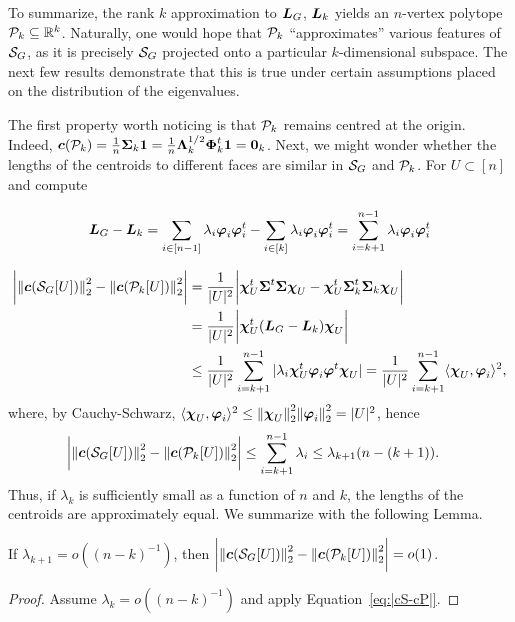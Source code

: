 To  summarize, the rank $k$ approximation to $\L_G$, $\L_k$  yields an  $n$-vertex polytope  $\P_k\subset\R^k$. Naturally, one would hope that $\P_k$    ``approximates'' various features of $\splx_G$, as it is precisely $\splx_G$ projected  onto a particular $k$-dimensional subspace. The next few results  demonstrate that this is true under certain  assumptions placed on the distribution of the eigenvalues. 
 
 The first property worth noticing is that $\P_k$ remains  centred at the  origin. Indeed,  $\cent(\P_k) = \frac{1}{n}\Sv_k\one = \frac{1}{n}\Eval_k^{1/2}\Eig_k^\tp\one=\zero_k$.  Next, we might wonder  whether the lengths of the  centroids to different faces  are similar in $\splx_G$ and $\P_k$. For  $U\subset [n]$ and compute 
 
 \begin{align*}
 \L_G-\L_k = \sum_{i\in[n-1]}\lambda_i\vp_i\vp_i^\tp - \sum_{i\in[k]}\lambda_i\vp_i\vp_i^\tp = \sum_{i=k+1}^{n-1}\lambda_i  \vp_i\vp_i^\tp 
 \end{align*}
 
 \begin{align*}
 \bigg|\norm{\cent(\splx_G[U])}_2^2 - \norm{\cent(\P_k[U])}_2^2\bigg| &= \frac{1}{|U|^2}\bigg| \bchi_U^\tp \Sv^\tp\Sv\bchi_U - \bchi_U^\tp \Sv_k^\tp\Sv_k\bchi_U \bigg| \\
 &= \frac{1}{|U|^2} \bigg|\bchi_U^\tp (\L_G-\L_k)\bchi_U\bigg| \\
 &\leq  \frac{1}{|U|^2} \sum_{i=k+1}^{n-1}|\lambda_i \bchi_U^\tp \vp_i\vp^\tp\bchi_U |=   \frac{1}{|U|^2} \sum_{i=k+1}^{n-1}\la \bchi_U,\vp_i\ra^2,
 \end{align*}
 where, by Cauchy-Schwarz, $\la \bchi_U,\vp_i\ra^2 \leq \norm{\bchi_U}_2^2 \norm{\vp_i}_2^2 = |U|^2$, 
 hence  
 \begin{align}
  \bigg|\norm{\cent(\splx_G[U])}_2^2 - \norm{\cent(\P_k[U])}_2^2\bigg| &\leq \sum_{i=k+1}^{n-1}  \lambda_i  \leq \lambda_{k+1} (n-(k+1)). \label{eq:|cS-cP|}
 \end{align}
 Thus, if $\lambda_k$ is sufficiently small as a function  of $n$ and $k$, the lengths of the centroids are approximately equal. We summarize with  the following Lemma. 
 
 \begin{lemma}
 	If $\lambda_{k+1} = o((n-k)^{-1})$, then  $ \bigg|\norm{\cent(\splx_G[U])}_2^2 - \norm{\cent(\P_k[U])}_2^2\bigg| = o(1)$. 
 \end{lemma}
\begin{proof}
	Assume $\lambda_k = o((n-k)^{-1})$ and apply Equation~\eqref{eq:|cS-cP|}. 
\end{proof}

